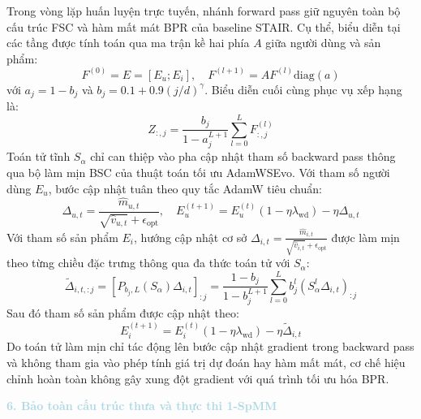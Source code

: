 Trong vòng lặp huấn luyện trực tuyến, nhánh forward pass giữ nguyên toàn bộ cấu trúc FSC và hàm mất mát BPR của baseline STAIR. Cụ thể, biểu diễn tại các tầng được tính toán qua ma trận kề hai phía $A$ giữa người dùng và sản phẩm:
\begin{equation}
F^{(0)} = E = [E_u; E_i], \quad F^{(l+1)} = A F^{(l)} \text{diag}(a)
\end{equation}
với $a_j = 1 - b_j$ và $b_j = 0.1 + 0.9(j/d)^\gamma$. Biểu diễn cuối cùng phục vụ xếp hạng là:
\begin{equation}
Z_{:, j} = \frac{b_j}{1 - a_j^{L+1}} \sum_{l=0}^{L} F^{(l)}_{:, j}
\end{equation}
Toán tử tĩnh $S_\alpha$ chỉ can thiệp vào pha cập nhật tham số backward pass thông qua bộ làm mịn BSC của thuật toán tối ưu AdamWSEvo. Với tham số người dùng $E_u$, bước cập nhật tuân theo quy tắc AdamW tiêu chuẩn:
\begin{equation}
\Delta_{u, t} = \frac{\hat{m}_{u, t}}{\sqrt{\hat{v}_{u, t}} + \epsilon_{\text{opt}}}, \quad E_u^{(t+1)} = E_u^{(t)} (1 - \eta \lambda_{\text{wd}}) - \eta \Delta_{u, t}
\end{equation}
Với tham số sản phẩm $E_i$, hướng cập nhật cơ sở $\Delta_{i, t} = \frac{\hat{m}_{i, t}}{\sqrt{\hat{v}_{i, t}} + \epsilon_{\text{opt}}}$ được làm mịn theo từng chiều đặc trưng thông qua đa thức toán tử với $S_\alpha$:
\begin{equation}
\tilde{\Delta}_{i, t, :j} = \left[ P_{b_j, L}(S_\alpha) \Delta_{i, t} \right]_{:j} = \frac{1 - b_j}{1 - b_j^{L+1}} \sum_{l=0}^{L} b_j^l \left( S_\alpha^l \Delta_{i, t} \right)_{:j}
\end{equation}
Sau đó tham số sản phẩm được cập nhật theo:
\begin{equation}
E_i^{(t+1)} = E_i^{(t)} (1 - \eta \lambda_{\text{wd}}) - \eta \tilde{\Delta}_{i, t}
\end{equation}
Do toán tử làm mịn chỉ tác động lên bước cập nhật gradient trong backward pass và không tham gia vào phép tính giá trị dự đoán hay hàm mất mát, cơ chế hiệu chỉnh hoàn toàn không gây xung đột gradient với quá trình tối ưu hóa BPR.

\noindent\textcolor{lightblue}{\textbf{6. Bảo toàn cấu trúc thưa và thực thi 1-SpMM}}

